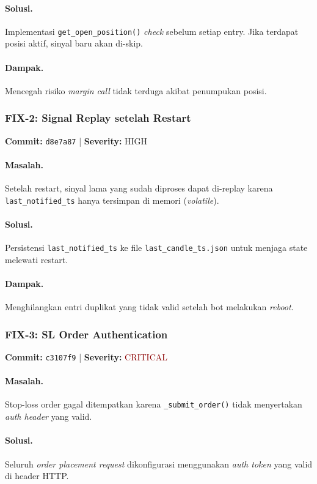 \documentclass[10pt,a4paper]{article}
\begin{document}
\paragraph{Solusi.} Implementasi \texttt{get\_open\_position()} \emph{check} sebelum setiap entry. Jika terdapat posisi aktif, sinyal baru akan di-skip.
\paragraph{Dampak.} Mencegah risiko \textit{margin call} tidak terduga akibat penumpukan posisi.

\subsubsection{FIX-2: Signal Replay setelah Restart}
\textbf{Commit:} \texttt{d8e7a87} | \textbf{Severity:} HIGH

\paragraph{Masalah.} Setelah restart, sinyal lama yang sudah diproses dapat di-replay karena \texttt{last\_notified\_ts} hanya tersimpan di memori (\textit{volatile}).
\paragraph{Solusi.} Persistensi \texttt{last\_notified\_ts} ke file \texttt{last\_candle\_ts\allowbreak{}.json} untuk menjaga state melewati restart.
\paragraph{Dampak.} Menghilangkan entri duplikat yang tidak valid setelah bot melakukan \textit{reboot}.

\subsubsection{FIX-3: SL Order Authentication}
\textbf{Commit:} \texttt{c3107f9} | \textbf{Severity:} \textcolor{darkred}{CRITICAL}

\paragraph{Masalah.} Stop-loss order gagal ditempatkan karena \texttt{\_submit\_order()} tidak menyertakan \textit{auth header} yang valid.
\paragraph{Solusi.} Seluruh \textit{order placement request} dikonfigurasi menggunakan \textit{auth token} yang valid di header HTTP.
\end{document}
